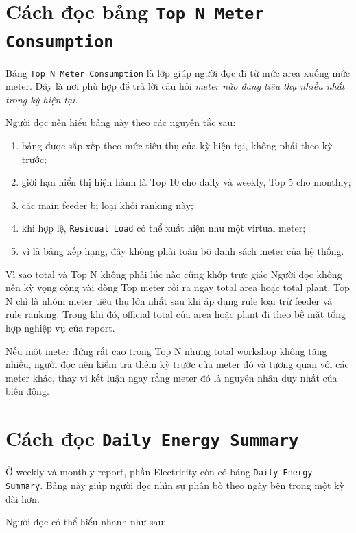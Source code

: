 \section{Cách đọc bảng \texttt{Top N Meter Consumption}}

Bảng \texttt{Top N Meter Consumption} là lớp giúp người đọc đi từ mức area xuống mức meter. Đây là nơi phù hợp để trả lời câu hỏi \textit{meter nào đang tiêu thụ nhiều nhất trong kỳ hiện tại}.

Người đọc nên hiểu bảng này theo các nguyên tắc sau:

\begin{enumerate}[label=-]
\item bảng được sắp xếp theo mức tiêu thụ của kỳ hiện tại, không phải theo kỳ trước;
\item giới hạn hiển thị hiện hành là Top 10 cho daily và weekly, Top 5 cho monthly;
\item các main feeder bị loại khỏi ranking này;
\item khi hợp lệ, \texttt{Residual Load} có thể xuất hiện như một virtual meter;
\item vì là bảng xếp hạng, đây không phải toàn bộ danh sách meter của hệ thống.
\end{enumerate}

\begin{ReaderNote}{Vì sao total và Top N không phải lúc nào cũng khớp trực giác}
Người đọc không nên kỳ vọng cộng vài dòng Top meter rồi ra ngay total area hoặc total plant. Top N chỉ là nhóm meter tiêu thụ lớn nhất sau khi áp dụng rule loại trừ feeder và rule ranking. Trong khi đó, official total của area hoặc plant đi theo bề mặt tổng hợp nghiệp vụ của report.
\end{ReaderNote}

Nếu một meter đứng rất cao trong Top N nhưng total workshop không tăng nhiều, người đọc nên kiểm tra thêm kỳ trước của meter đó và tương quan với các meter khác, thay vì kết luận ngay rằng meter đó là nguyên nhân duy nhất của biến động.

\section{Cách đọc \texttt{Daily Energy Summary}}

Ở weekly và monthly report, phần Electricity còn có bảng \texttt{Daily Energy Summary}. Bảng này giúp người đọc nhìn sự phân bố theo ngày bên trong một kỳ dài hơn.

Người đọc có thể hiểu nhanh như sau:

